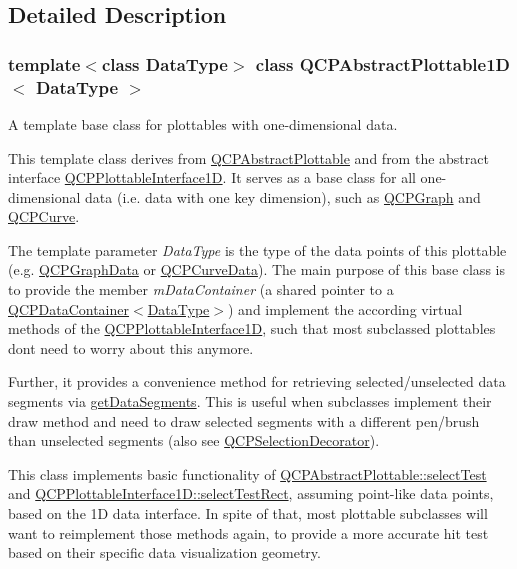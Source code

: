 \subsection{Detailed Description}
\subsubsection*{template$<$class Data\+Type$>$\newline
class Q\+C\+P\+Abstract\+Plottable1\+D$<$ Data\+Type $>$}

A template base class for plottables with one-\/dimensional data. 

This template class derives from \hyperlink{classQCPAbstractPlottable}{Q\+C\+P\+Abstract\+Plottable} and from the abstract interface \hyperlink{classQCPPlottableInterface1D}{Q\+C\+P\+Plottable\+Interface1D}. It serves as a base class for all one-\/dimensional data (i.\+e. data with one key dimension), such as \hyperlink{classQCPGraph}{Q\+C\+P\+Graph} and \hyperlink{classQCPCurve}{Q\+C\+P\+Curve}.

The template parameter {\itshape Data\+Type} is the type of the data points of this plottable (e.\+g. \hyperlink{classQCPGraphData}{Q\+C\+P\+Graph\+Data} or \hyperlink{classQCPCurveData}{Q\+C\+P\+Curve\+Data}). The main purpose of this base class is to provide the member {\itshape m\+Data\+Container} (a shared pointer to a \hyperlink{classQCPDataContainer}{Q\+C\+P\+Data\+Container$<$Data\+Type$>$}) and implement the according virtual methods of the \hyperlink{classQCPPlottableInterface1D}{Q\+C\+P\+Plottable\+Interface1D}, such that most subclassed plottables don\textquotesingle{}t need to worry about this anymore.

Further, it provides a convenience method for retrieving selected/unselected data segments via \hyperlink{classQCPAbstractPlottable1D_ae890e62ce403c54f575c73b9529f1af8}{get\+Data\+Segments}. This is useful when subclasses implement their draw method and need to draw selected segments with a different pen/brush than unselected segments (also see \hyperlink{classQCPSelectionDecorator}{Q\+C\+P\+Selection\+Decorator}).

This class implements basic functionality of \hyperlink{classQCPAbstractPlottable_addb3f5c41f007a78c3e142cc605bc712}{Q\+C\+P\+Abstract\+Plottable\+::select\+Test} and \hyperlink{classQCPPlottableInterface1D_a67093e4ccf490ff5f7750640941ff34c}{Q\+C\+P\+Plottable\+Interface1\+D\+::select\+Test\+Rect}, assuming point-\/like data points, based on the 1D data interface. In spite of that, most plottable subclasses will want to reimplement those methods again, to provide a more accurate hit test based on their specific data visualization geometry. 

